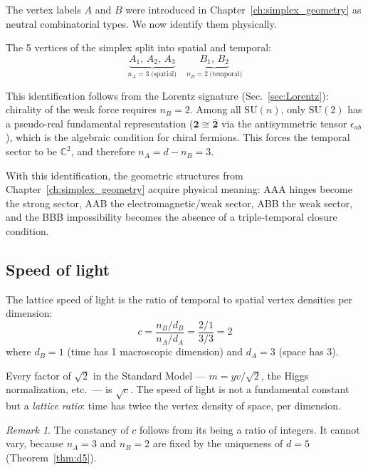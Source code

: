 \documentclass[12pt]{article}
\theoremstyle{remark}
\newtheorem{remark}[theorem]{Remark}
\theoremstyle{definition}
\begin{document}
The vertex labels $A$ and $B$ were introduced in Chapter~\ref{ch:simplex_geometry} as neutral combinatorial types. We now identify them physically.

The 5 vertices of the simplex split into spatial and temporal:
\begin{equation}
\underbrace{A_1,\,A_2,\,A_3}_{n_A = 3\;\text{(spatial)}} \quad \underbrace{B_1,\,B_2}_{n_B = 2\;\text{(temporal)}}
\end{equation}

This identification follows from the Lorentz signature (Sec.~\ref{sec:Lorentz}): chirality of the weak force requires $n_B = 2$. Among all $\text{SU}(n)$, only $\text{SU}(2)$ has a pseudo-real fundamental representation ($\mathbf{2} \cong \bar{\mathbf{2}}$ via the antisymmetric tensor $\epsilon_{ab}$), which is the algebraic condition for chiral fermions. This forces the temporal sector to be $\mathbb{C}^2$, and therefore $n_A = d - n_B = 3$.

With this identification, the geometric structures from Chapter~\ref{ch:simplex_geometry} acquire physical meaning: AAA hinges become the strong sector, AAB the electromagnetic/weak sector, ABB the weak sector, and the BBB impossibility becomes the absence of a triple-temporal closure condition.

\subsection{Speed of light}

The lattice speed of light is the ratio of temporal to spatial vertex densities per dimension:
\begin{equation}
\boxed{c = \frac{n_B / d_B}{n_A / d_A} = \frac{2/1}{3/3} = 2}
\label{eq:speed_of_light}
\end{equation}
where $d_B = 1$ (time has 1 macroscopic dimension) and $d_A = 3$ (space has 3).

Every factor of $\sqrt{2}$ in the Standard Model --- $m = yv/\sqrt{2}$, the Higgs normalization, etc.\ --- is $\sqrt{c}$. The speed of light is not a fundamental constant but a \emph{lattice ratio}: time has twice the vertex density of space, per dimension.

\begin{remark}
The constancy of $c$ follows from its being a ratio of integers. It cannot vary, because $n_A = 3$ and $n_B = 2$ are fixed by the uniqueness of $d = 5$ (Theorem~\ref{thm:d5}).
\end{remark}
\end{document}
